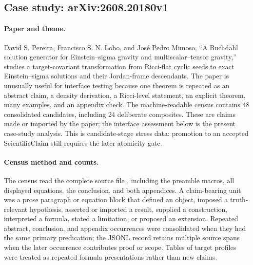 \subsection{Case study: arXiv:2608.20180v1}
\label{case:2608-20180}

\paragraph{Paper and theme.}
David S. Pereira, Francisco S. N. Lobo, and Jos\'e Pedro Mimoso, ``A Buchdahl solution generator for Einstein--sigma gravity and multiscalar--tensor gravity,'' studies a target-covariant transformation from Ricci-flat cyclic seeds to exact Einstein--sigma solutions and their Jordan-frame descendants. The paper is unusually useful for interface testing because one theorem is repeated as an abstract claim, a density derivation, a Ricci-level statement, an explicit theorem, many examples, and an appendix check. The machine-readable census contains 48 consolidated candidates, including 24 deliberate composites. These are claims made or imported by the paper; the interface assessment below is the present case-study analysis. This is candidate-stage stress data: promotion to an accepted ScientificClaim still requires the later atomicity gate.

\paragraph{Census method and counts.}
The census read the complete source file , including the preamble macros, all displayed equations, the conclusion, and both appendices. A claim-bearing unit was a prose paragraph or equation block that defined an object, imposed a truth-relevant hypothesis, asserted or imported a result, supplied a construction, interpreted a formula, stated a limitation, or proposed an extension. Repeated abstract, conclusion, and appendix occurrences were consolidated when they had the same primary predication; the JSONL record retains multiple source spans when the later occurrence contributes proof or scope. Tables of target profiles were treated as repeated formula presentations rather than new claims.

